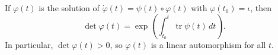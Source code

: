 If $\varphi(t)$ is the solution of $\dot{\varphi}(t) = \psi(t) \circ \varphi(t)$ with $\varphi(t_0) = \iota$, then
$$\det \varphi(t) = \exp\left( \int_{t_0}^{t} \operatorname{tr} \psi(t) \, dt \right).$$
In particular, $\det \varphi(t) > 0$, so $\varphi(t)$ is a linear automorphism for all $t$.
